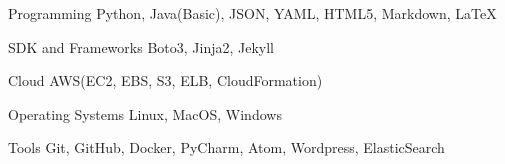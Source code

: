 

\begin{cvskills}

  \cvskill
    {Programming} %
    {Python, Java(Basic), JSON, YAML, HTML5, Markdown, LaTeX} %

  \cvskill
    {SDK and Frameworks} %
    {Boto3, Jinja2, Jekyll} %

  \cvskill
    {Cloud} %
    {AWS(EC2, EBS, S3, ELB, CloudFormation)} %


  \cvskill
    {Operating Systems} %
    {Linux, MacOS, Windows} %


  \cvskill
    {Tools} %
    {Git, GitHub, Docker, PyCharm, Atom, Wordpress, ElasticSearch } %

\end{cvskills}

